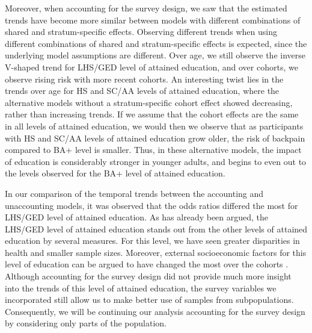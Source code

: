 \vspace{-0.2cm}
Moreover, when accounting for the survey design, we saw that the estimated trends have become more similar between models with different combinations of shared and stratum-specific effects. Observing different trends when using different combinations of shared and stratum-specific effects is expected, since the underlying model assumptions are different. Over age, we still observe the inverse V-shaped trend for LHS/GED level of attained education, and over cohorts, we observe rising risk with more recent cohorts. An interesting twist lies in the trends over age for HS and SC/AA levels of attained education, where the alternative models without a stratum-specific cohort effect showed decreasing, rather than increasing trends. If we assume that the cohort effects are the same in all levels of attained education, we would then we observe that as participants with HS and SC/AA levels of attained education grow older, the risk of backpain compared to BA+ level is smaller. Thus, in these alternative models, the impact of education is considerably stronger in younger adults, and begins to even out to the levels observed for the BA+ level of attained education.

\vspace{-0.2cm}
In our comparison of the temporal trends between the accounting and unaccounting models, it was observed that the odds ratios differed the most for LHS/GED level of attained education. As has already been argued, the LHS/GED level of attained education stands out from the other levels of attained education by several measures. For this level, we have seen greater disparities in health and smaller sample sizes. Moreover, external socioeconomic factors for this level of education can be argued to have changed the most over the cohorts \citep{dowd2014life,montez2011trends,hendi2015trends}. Although accounting for the survey design did not provide much more insight into the trends of this level of attained education, the survey variables we incorporated still allow us to make better use of samples from subpopulations. Consequently, we will be continuing our analysis accounting for the survey design by considering only parts of the population.

\FloatBarrier
